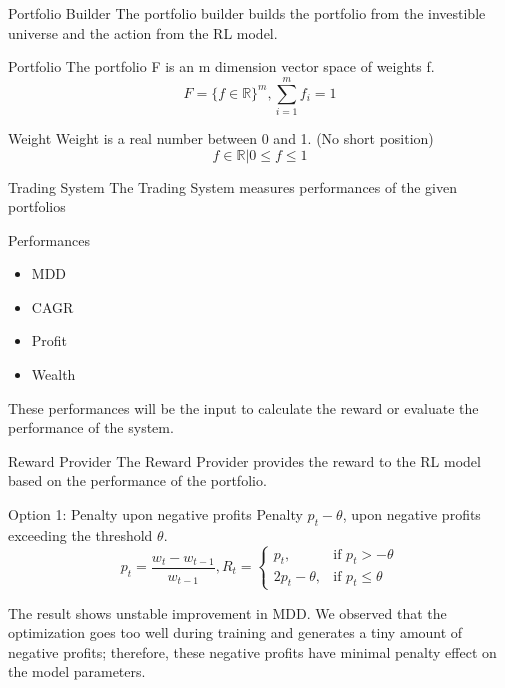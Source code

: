 \begin{frame}{Portfolio Builder}
The portfolio builder builds the portfolio from the investible universe and the action from the RL model.
\\
\begin{block}{Portfolio}
The portfolio F is an m dimension vector space of weights f.
\[
    F = \{ {f \in \mathbb{R} } \} ^m,
    \sum_{i=1}^m {f_i} =1
\]
\end{block}
\begin{block}{Weight}
Weight is a real number between 0 and 1. \alert{(No short position)}
\[
    f \in \mathbb{R} | 0 \leq f \leq 1 
\]
\end{block}
\end{frame}


\begin{frame}{Trading System}
The Trading System measures performances of the given portfolios
\begin{block}{Performances}
\begin{itemize}
    \item MDD
    \item CAGR
    \item Profit
    \item Wealth
\end{itemize}
\end{block}
These performances will be the input to calculate the reward or evaluate the performance of the system. 
\end{frame}


\begin{frame}{Reward Provider}
The Reward Provider provides the reward to the RL model based on the performance of the portfolio.
\begin{block}{Option 1: Penalty upon negative profits}
Penalty \(p_t-\theta\), upon negative profits exceeding the threshold \(\theta\). 
\[
p_t = \frac{w_t-w_{t-1}}{w_{t-1}}
, 
R_t = 
\begin{cases}
    p_t,&\text{if  }p_t > -\theta\\
    2p_t - \theta ,&\text{if  }p_t \leq  \theta
\end{cases}
\]
\end{block}
\alert{
The result shows unstable improvement in MDD. We observed that the optimization goes too well during training and generates a tiny amount of negative profits; therefore, these negative profits have minimal penalty effect on the model parameters.
}

\end{frame}

